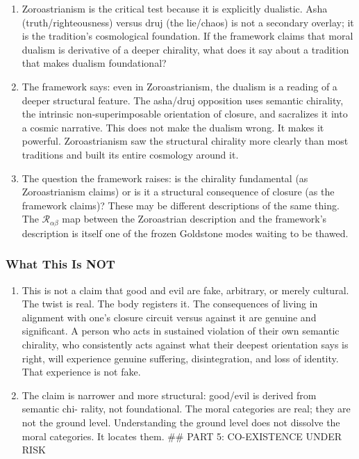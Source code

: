 \documentclass[
]{article}
\providecommand{\tightlist}{%
  \setlength{\itemsep}{0pt}\setlength{\parskip}{0pt}}
\begin{document}
\begin{enumerate}
\def\labelenumi{\arabic{enumi}.}
\setcounter{enumi}{193}
\item
  Zoroastrianism is the critical test because it is explicitly
  dualistic. Asha (truth/righteousness) versus druj (the lie/chaos) is
  not a secondary overlay; it is the tradition's cosmological
  foundation. If the framework claims that moral dualism is derivative
  of a deeper chirality, what does it say about a tradition that makes
  dualism foundational?
\item
  The framework says: even in Zoroastrianism, the dualism is a reading
  of a deeper structural feature. The asha/druj opposition uses semantic
  chirality, the intrinsic non-superimposable orientation of closure,
  and sacralizes it into a cosmic narrative. This does not make the
  dualism wrong. It makes it powerful. Zoroastrianism saw the structural
  chirality more clearly than most traditions and built its entire
  cosmology around it.
\item
  The question the framework raises: is the chirality fundamental (as
  Zoroastrianism claims) or is it a structural consequence of closure
  (as the framework claims)? These may be different descriptions of the
  same thing. The \(\mathcal{R}_{\alpha\beta}\) map between the
  Zoroastrian description and the framework's description is itself one
  of the frozen Goldstone modes waiting to be thawed.
\end{enumerate}

\subsubsection{What This Is NOT}\label{what-this-is-not}

\begin{enumerate}
\def\labelenumi{\arabic{enumi}.}
\setcounter{enumi}{196}
\tightlist
\item
  This is not a claim that good and evil are fake, arbitrary, or merely
  cultural. The twist is real. The body registers it. The consequences
  of living in alignment with one's closure circuit versus against it
  are genuine and significant. A person who acts in sustained violation
  of their own semantic chirality, who consistently acts against what
  their deepest orientation says is right, will experience genuine
  suffering, disintegration, and loss of identity. That experience is
  not fake.
\item
  The claim is narrower and more structural: good/evil is derived from
  semantic chi- rality, not foundational. The moral categories are real;
  they are not the ground level. Understanding the ground level does not
  dissolve the moral categories. It locates them. \#\# PART 5:
  CO-EXISTENCE UNDER RISK
\end{enumerate}
\end{document}
